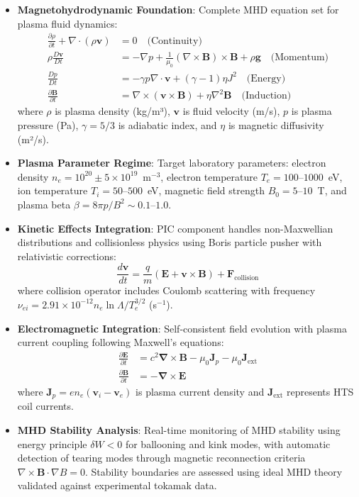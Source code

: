 \documentclass[10pt,twocolumn]{article}
\newcommand{\ddt}[1]{\frac{\partial #1}{\partial t}}
\newcommand{\curl}{\boldsymbol{\nabla} \times}
\begin{document}
\begin{itemize}
\item \textbf{Magnetohydrodynamic Foundation}: Complete MHD equation set for plasma fluid dynamics:
\begin{align}
\frac{\partial \rho}{\partial t} + \nabla \cdot (\rho \mathbf{v}) &= 0 \quad \text{(Continuity)} \\
\rho \frac{D\mathbf{v}}{Dt} &= -\nabla p + \frac{1}{\mu_0}(\nabla \times \mathbf{B}) \times \mathbf{B} + \rho \mathbf{g} \quad \text{(Momentum)} \\
\frac{Dp}{Dt} &= -\gamma p \nabla \cdot \mathbf{v} + (\gamma - 1) \eta J^2 \quad \text{(Energy)} \\
\frac{\partial \mathbf{B}}{\partial t} &= \nabla \times (\mathbf{v} \times \mathbf{B}) + \eta \nabla^2 \mathbf{B} \quad \text{(Induction)}
\end{align}
where $\rho$ is plasma density (kg/m³), $\mathbf{v}$ is fluid velocity (m/s), $p$ is plasma pressure (Pa), $\gamma = 5/3$ is adiabatic index, and $\eta$ is magnetic diffusivity (m²/s).

\item \textbf{Plasma Parameter Regime}: Target laboratory parameters: electron density $n_e = 10^{20} \pm 5 \times 10^{19}$~m$^{-3}$, electron temperature $T_e = 100$--$1000$~eV, ion temperature $T_i = 50$--$500$~eV, magnetic field strength $B_0 = 5$--$10$~T, and plasma beta $\beta = 8\pi p / B^2 \sim 0.1$--$1.0$.

\item \textbf{Kinetic Effects Integration}: PIC component handles non-Maxwellian distributions and collisionless physics using Boris particle pusher with relativistic corrections:
\begin{equation}
\frac{d\mathbf{v}}{dt} = \frac{q}{m}\left(\mathbf{E} + \mathbf{v} \times \mathbf{B}\right) + \mathbf{F}_{\text{collision}}
\end{equation}
where collision operator includes Coulomb scattering with frequency $\nu_{ei} = 2.91 \times 10^{-12} n_e \ln\Lambda / T_e^{3/2}$ (s$^{-1}$).

\item \textbf{Electromagnetic Integration}: Self-consistent field evolution with plasma current coupling following Maxwell's equations:
\begin{align}
\ddt{\mathbf{E}} &= c^2 \curl \mathbf{B} - \mu_0 \mathbf{J}_p - \mu_0 \mathbf{J}_{\text{ext}} \\
\ddt{\mathbf{B}} &= -\curl \mathbf{E}
\end{align}
where $\mathbf{J}_p = en_e(\mathbf{v}_i - \mathbf{v}_e)$ is plasma current density and $\mathbf{J}_{\text{ext}}$ represents HTS coil currents.

\item \textbf{MHD Stability Analysis}: Real-time monitoring of MHD stability using energy principle $\delta W < 0$ for ballooning and kink modes, with automatic detection of tearing modes through magnetic reconnection criteria $\nabla \times \mathbf{B} \cdot \nabla B = 0$. Stability boundaries are assessed using ideal MHD theory validated against experimental tokamak data.
\end{itemize}
\end{document}
